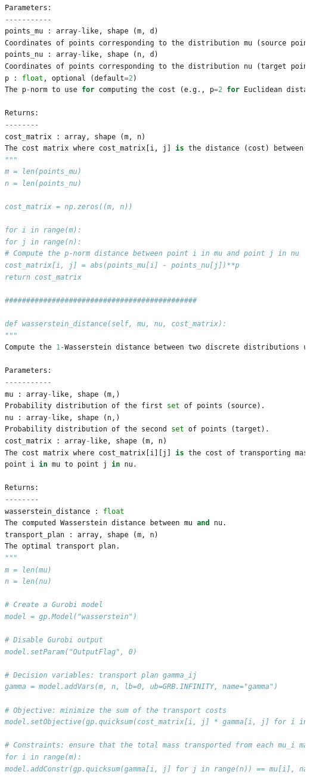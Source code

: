 \documentclass[a4paper,12pt]{article}
\begin{document}
\begin{lstlisting}[language=python,caption={class ScenarioTree},label={lst:class-scenario-tree}]
Parameters:
-----------
points_mu : array-like, shape (m, d)
Coordinates of points corresponding to the distribution mu (source points).
points_nu : array-like, shape (n, d)
Coordinates of points corresponding to the distribution nu (target points).
p : float, optional (default=2)
The p-norm to use for computing the cost (e.g., p=2 for Euclidean distance, p=1 for Manhattan distance).

Returns:
--------
cost_matrix : array, shape (m, n)
The cost matrix where cost_matrix[i, j] is the distance (cost) between points_mu[i] and points_nu[j].
"""
m = len(points_mu)
n = len(points_nu)

cost_matrix = np.zeros((m, n))

for i in range(m):
for j in range(n):
# Compute the p-norm distance between point i in mu and point j in nu
cost_matrix[i, j] = abs(points_mu[i] - points_nu[j])**p
return cost_matrix

#############################################

def wasserstein_distance(self, mu, nu, cost_matrix):
"""
Compute the 1-Wasserstein distance between two discrete distributions using Gurobi.

Parameters:
-----------
mu : array-like, shape (m,)
Probability distribution of the first set of points (source).
nu : array-like, shape (n,)
Probability distribution of the second set of points (target).
cost_matrix : array-like, shape (m, n)
The cost matrix where cost_matrix[i][j] is the cost of transporting mass from
point i in mu to point j in nu.

Returns:
--------
wasserstein_distance : float
The computed Wasserstein distance between mu and nu.
transport_plan : array, shape (m, n)
The optimal transport plan.
"""
m = len(mu)
n = len(nu)

# Create a Gurobi model
model = gp.Model("wasserstein")

# Disable Gurobi output 
model.setParam("OutputFlag", 0)

# Decision variables: transport plan gamma_ij
gamma = model.addVars(m, n, lb=0, ub=GRB.INFINITY, name="gamma")

# Objective: minimize the sum of the transport costs
model.setObjective(gp.quicksum(cost_matrix[i, j] * gamma[i, j] for i in range(m) for j in range(n)), GRB.MINIMIZE)

# Constraints: ensure that the total mass transported from each mu_i matches the corresponding mass in mu
for i in range(m):
model.addConstr(gp.quicksum(gamma[i, j] for j in range(n)) == mu[i], name=f"supply_{i}")


\end{lstlisting}
\end{document}
